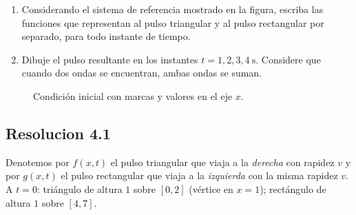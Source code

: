 \documentclass[
  11pt,
  letterpaper,
   addpoints,
   answers
  ]{exam}
\begin{document}
\begin{questions}
\begin{enumerate}
  \item Considerando el sistema de referencia mostrado en la figura, escriba las funciones
  que representan al pulso triangular y al pulso rectangular por separado, para todo instante de tiempo.
  \item Dibuje el pulso resultante en los instantes $t=1,2,3,4~\mathrm{s}$. Considere que cuando
  dos ondas se encuentran, ambas ondas se suman.
\end{enumerate}

\begin{figure}[h!]
\centering
{}
\caption{Condición inicial con marcas y valores en el eje $x$.}
\end{figure}
\begin{solution}

\subsection*{Resolucion 4.1 }

Denotemos por $f(x,t)$ el pulso triangular que viaja a la \emph{derecha} con rapidez $v$ y por $g(x,t)$ el pulso rectangular que viaja a la \emph{izquierda} con la misma rapidez $v$. A $t=0$: triángulo de altura $1$ sobre $[0,2]$ (vértice en $x=1$); rectángulo de altura $1$ sobre $[4,7]$.


\end{solution}
\end{questions}
\end{document}
